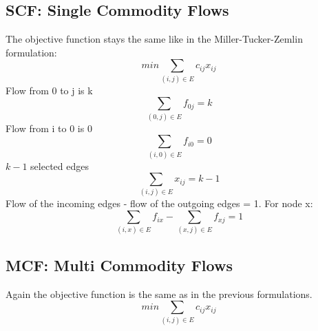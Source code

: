 \documentclass{article}
\begin{document}
\subsection{SCF: Single Commodity Flows \label{scf}}
The objective function stays the same like in the Miller-Tucker-Zemlin formulation:
\begin{equation}
min \sum_{(i,j) \in E} c_{ij} x_{ij}
\end{equation}
Flow from 0 to j is k
\begin{equation}
\sum_{(0,j) \in E} f_{0j} = k
\end{equation}
Flow from i to 0 is 0
\begin{equation}
\sum_{(i,0) \in E} f_{i0} = 0
\end{equation}
$k-1$ selected edges
\begin{equation}
\sum_{(i,j) \in E} x_{ij} = k - 1
\end{equation}
Flow of the incoming edges - flow of the outgoing edges = 1. For node x: 
\begin{equation}
\sum_{(i,x) \in E} f_{ix} - \sum_{(x,j) \in E} f_{xj} = 1
\end{equation}



\subsection{MCF: Multi Commodity Flows \label{mcf}}
Again the objective function is the same as in the previous formulations.
\begin{equation}
min \sum_{(i,j) \in E} c_{ij} x_{ij}
\end{equation}
\end{document}
